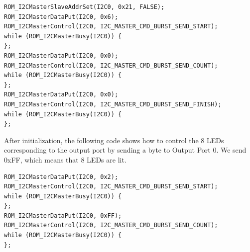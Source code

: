 \begin{lstlisting}[style=code, caption={Pseud Code for Initializing the I2C Slave Device for the Ouput Port LED Lights}, captionpos=b]
ROM_I2CMasterSlaveAddrSet(I2C0, 0x21, FALSE);
ROM_I2CMasterDataPut(I2C0, 0x6);
ROM_I2CMasterControl(I2C0, I2C_MASTER_CMD_BURST_SEND_START);
while (ROM_I2CMasterBusy(I2C0)) {
};
ROM_I2CMasterDataPut(I2C0, 0x0);
ROM_I2CMasterControl(I2C0, I2C_MASTER_CMD_BURST_SEND_COUNT);
while (ROM_I2CMasterBusy(I2C0)) {
};
ROM_I2CMasterDataPut(I2C0, 0x0);
ROM_I2CMasterControl(I2C0, I2C_MASTER_CMD_BURST_SEND_FINISH);
while (ROM_I2CMasterBusy(I2C0)) {
};
\end{lstlisting}

After initialization, the following code shows how to control the 8 LEDs corresponding to the output port by sending a byte to Output Port 0. We send 0xFF, which means that 8 LEDs are lit.
\begin{lstlisting}[style=code, caption={Pseud Code for Controlling LED Lights}, captionpos=b]
ROM_I2CMasterDataPut(I2C0, 0x2);
ROM_I2CMasterControl(I2C0, I2C_MASTER_CMD_BURST_SEND_START);
while (ROM_I2CMasterBusy(I2C0)) {
};
ROM_I2CMasterDataPut(I2C0, 0xFF);
ROM_I2CMasterControl(I2C0, I2C_MASTER_CMD_BURST_SEND_COUNT);
while (ROM_I2CMasterBusy(I2C0)) {
};
\end{lstlisting}
